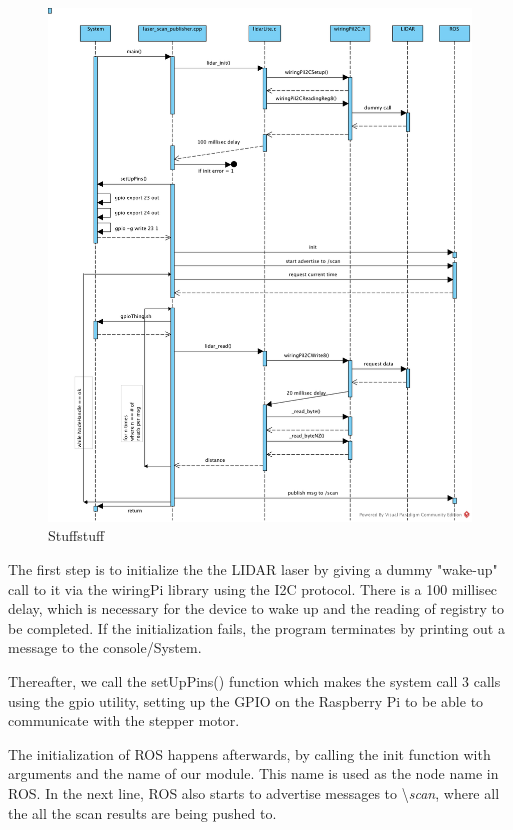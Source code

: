 \begin{figure}[H]
	\centering
	\includegraphics[scale=.6]{images/laser-module.png}
	\caption{Stuffstuff}
	\label{fig:lasermodule}
\end{figure}

The first step is to initialize the the LIDAR laser by giving a dummy "wake-up" call to it via the wiringPi library using the I2C protocol. There is a 100 millisec delay, which is necessary for the device to wake up and the reading of registry to be completed. If the initialization fails, the program terminates by printing out a message to the console/System.

Thereafter, we call the setUpPins() function which makes the system call 3 calls using the gpio utility, setting up the GPIO on the Raspberry Pi to be able to communicate with the stepper motor.

The initialization of ROS happens afterwards, by calling the init function with arguments and the name of our module. This name is used as the node name in ROS. In the next line, ROS also starts to advertise messages to \textbackslash\textit{scan}, where all the all the scan results are being pushed to.

